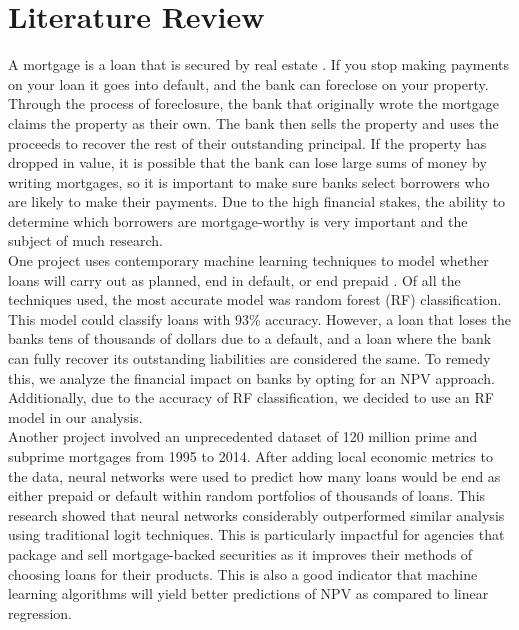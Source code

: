 \documentclass[12 pt]{uncw_thesis}
\theoremstyle{plain}
\theoremstyle{remark}
\theoremstyle{definition}
\begin{document}
\section{Literature Review}
A mortgage is a loan that is secured by real estate \cite{Fannie}. If you stop making payments on your loan it goes into default, and the bank can foreclose on your property. Through the process of foreclosure, the bank  that originally wrote the mortgage claims the property as their own. The bank then sells the property and uses the proceeds to recover the rest of their outstanding principal. If the property has dropped in value, it is possible that the bank can lose large sums of money by writing mortgages, so it is important to make sure banks select borrowers who are likely to make their payments. Due to the high financial stakes, the ability to determine which borrowers are mortgage-worthy is very important and the subject of much research.\\
One project uses contemporary machine learning techniques to model whether loans will carry out as planned, end in default, or end prepaid \cite{Deng}. Of all the techniques used, the most accurate model was random forest (RF) classification. This model could classify loans with 93\% accuracy. However, a loan that loses the banks tens of thousands of dollars due to a default, and a loan where the bank can fully recover its outstanding liabilities are considered the same. To remedy this, we analyze the financial impact on banks by opting for an NPV approach. Additionally, due to the accuracy of RF classification, we decided to use an RF model in our analysis. \\ 
Another project involved an unprecedented dataset of 120 million prime and subprime mortgages from 1995 to 2014\cite{Sirignano}. After adding local economic metrics to the data, neural networks were used to predict how many loans would be end as either prepaid or default within random portfolios of thousands of loans. This research showed that neural networks considerably outperformed similar analysis using traditional logit techniques. This is particularly impactful for agencies that package and sell mortgage-backed securities as it improves their methods of choosing loans for their products. This is also a good indicator that machine learning algorithms will yield better predictions of NPV as compared to linear regression.
\end{document}
